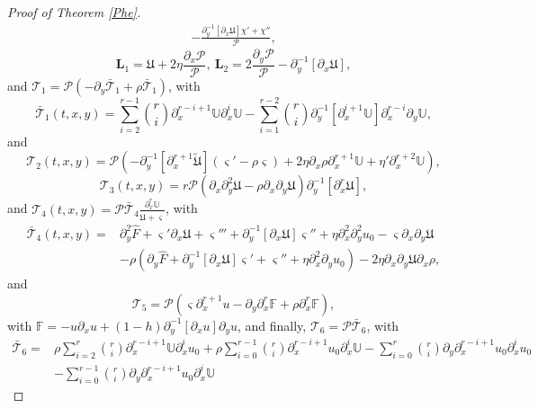 \documentclass[10pt,a4paper]{amsart}
\begin{document}
\begin{proof}[Proof of Theorem \ref{Phe}]
\begin{align*}
  -\frac{\partial_{y}^{-1}\left[\partial_{x}\mathfrak{U}\right]\chi'+\chi''}{\mathcal{P}},
\end{align*}
$$\mathbf{L}_{1}=\mathfrak{U}+2\eta\frac{\partial_{x}\mathcal{P}}{\mathcal{P}},
~\mathbf{L}_{2}=2\frac{\partial_{y}\mathcal{P}}{\mathcal{P}}-\partial_{y}^{-1}\left[\partial_{x}\mathfrak{U}\right],$$
and $\mathcal{T}_{1}=\mathcal{P}(-\partial_{y}\bar{\mathcal{T}}_{1}+\rho\bar{\mathcal{T}}_{1})$, with
$$
\bar{\mathcal{T}}_{1}(t,x,y)=
 \sum_{i=2}^{r-1}\binom{r}{i}\partial_{x}^{r-i+1}\mathbb{U}\partial_{x}^{i}\mathbb{U}
-\sum_{i=1}^{r-2}\binom{r}{i}\partial_{y}^{-1}[\partial_{x}^{i+1}\mathbb{U}]\partial_{x}^{r-i}\partial_{y}\mathbb{U},
$$
and
$$
\mathcal{T}_{2}(t,x,y)
= \mathcal{P}\left(-\partial_{y}^{-1}[\partial_{x}^{r+1}\tilde{\mathfrak{U}}](\varsigma'-\rho\varsigma)
 +2\eta\partial_{x}\rho\partial_{x}^{r+1}\mathbb{U}+\eta'\partial_{x}^{r+2}\mathbb{U}\right),
$$
$$
\mathcal{T}_{3}(t,x,y)
=r\mathcal{P}\left(\partial_{x}\partial_{y}^{2}\mathfrak{U}-\rho\partial_{x}\partial_{y}\mathfrak{U}\right)\partial_{y}^{-1}[\partial_{x}^{r}\mathfrak{U}],
$$
and $\mathcal{T}_{4}(t,x,y)=\mathcal{P}\bar{\mathcal{T}}_{4}\frac{\partial_{x}^{r}\mathbb{U}}{\dot{\mathfrak{U}}+\varsigma}$, with
\begin{align*}
\bar{\mathcal{T}}_{4}(t,x,y)
=&\partial_{y}^{2}\hat{F}+\varsigma'\partial_{x}\mathfrak{U}+\varsigma'''+\partial_{y}^{-1}[\partial_{x}\mathfrak{U}]\varsigma''+\eta\partial_{x}^{2}\partial_{y}^{2}u_{0}-\varsigma\partial_{x}\partial_{y}\mathfrak{U}\\
 &-\rho\left(\partial_{y}\hat{F}+\partial_{y}^{-1}[\partial_{x}\mathfrak{U}]\varsigma'+\varsigma''+\eta\partial_{x}^{2}\partial_{y}u_{0}\right)
  -2\eta\partial_{x}\partial_{y}\mathfrak{U}\partial_{x}\rho,
\end{align*}
and
$$
\mathcal{T}_{5}=\mathcal{P}(\varsigma\partial_{x}^{r+1}u-\partial_{y}\partial_{x}^{r}\mathbb{F}+\rho\partial_{x}^{r}\mathbb{F}),
$$
with $\mathbb{F}=-u\partial_{x}u+(1-h)\partial_{y}^{-1}[\partial_{x}u]\partial_{y}u$, and finally, $\mathcal{T}_{6}=\mathcal{P}\bar{\mathcal{T}}_{6}$, with
\begin{align*}
\bar{\mathcal{T}}_{6}
=& \rho\sum_{i=2}^{r}\binom{r}{i}\partial_{x}^{r-i+1}\mathbb{U}\partial_{x}^{i}u_{0}
  +\rho\sum_{i=0}^{r-1}\binom{r}{i}\partial_{x}^{r-i+1}u_{0}\partial_{x}^{i}\mathbb{U}
  -\sum_{i=0}^{r}\binom{r}{i}\partial_{y}\partial_{x}^{r-i+1}u_{0}\partial_{x}^{i}u_{0}\\
 &-\sum_{i=0}^{r-1}\binom{r}{i}\partial_{y}\partial_{x}^{r-i+1}u_{0}\partial_{x}^{i}\mathbb{U}

\end{align*}
\end{proof}
\end{document}
